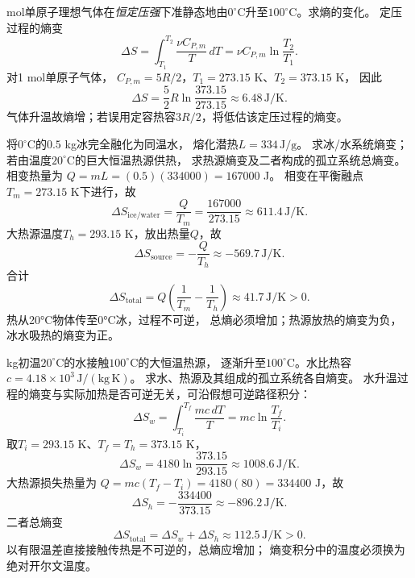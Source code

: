  mol单原子理想气体在\emph{恒定压强}下准静态地由$0^\circ$C升至$100^\circ$C。求熵的变化。
\workings
定压过程的熵变
\[
\Delta S=\int_{T_1}^{T_2}\frac{\nu C_{P,m}}T\,dT
=\nu C_{P,m}\ln\frac{T_2}{T_1}.
\]
对1 mol单原子气体，
$C_{P,m}=5R/2$，$T_1=273.15$ K、$T_2=373.15$ K，
因此
\[
\boxed{\Delta S=\frac52R\ln\frac{373.15}{273.15}
\approx6.48\,\mathrm{J/K}}.
\]
\crosscheck 气体升温故熵增；若误用定容热容$3R/2$，将低估该定压过程的熵变。

\problemtext 将$0^\circ$C的$0.5$ kg冰完全融化为同温水，
熔化潜热$L=334\,\mathrm{J/g}$。
求冰/水系统熵变；若由温度$20^\circ$C的巨大恒温热源供热，
求热源熵变及二者构成的孤立系统总熵变。
\workings
相变热量为
$Q=mL=(0.5)(334000)=167000$ J。
相变在平衡融点$T_m=273.15$ K下进行，故
\[
\boxed{\Delta S_{\mathrm{ice/water}}
=\frac{Q}{T_m}=\frac{167000}{273.15}
\approx611.4\,\mathrm{J/K}}.
\]
大热源温度$T_h=293.15$ K，放出热量$Q$，故
\[
\boxed{\Delta S_{\mathrm{source}}=-\frac{Q}{T_h}
\approx-569.7\,\mathrm{J/K}}.
\]
合计
\[
\boxed{\Delta S_{\mathrm{total}}
=Q\left(\frac1{T_m}-\frac1{T_h}\right)
\approx41.7\,\mathrm{J/K}>0}.
\]
\crosscheck 热从20°C物体传至0°C冰，过程不可逆，
总熵必须增加；热源放热的熵变为负，冰水吸热的熵变为正。

 kg初温$20^\circ$C的水接触$100^\circ$C的大恒温热源，
逐渐升至$100^\circ$C。水比热容
$c=4.18\times10^3\,\mathrm{J/(kg\,K)}$。
求水、热源及其组成的孤立系统各自熵变。
\workings
水升温过程的熵变与实际加热是否可逆无关，可沿假想可逆路径积分：
\[
\Delta S_w=\int_{T_i}^{T_f}\frac{mc\,dT}{T}
=mc\ln\frac{T_f}{T_i}.
\]
取$T_i=293.15$ K、$T_f=T_h=373.15$ K，
\[
\boxed{\Delta S_w
=4180\ln\frac{373.15}{293.15}
\approx1008.6\,\mathrm{J/K}}.
\]
大热源损失热量为
$Q=mc(T_f-T_i)=4180(80)=334400$ J，故
\[
\boxed{\Delta S_h=-\frac{334400}{373.15}
\approx-896.2\,\mathrm{J/K}}.
\]
二者总熵变
\[
\boxed{\Delta S_{\mathrm{total}}
=\Delta S_w+\Delta S_h
\approx112.5\,\mathrm{J/K}>0}.
\]
\crosscheck 以有限温差直接接触传热是不可逆的，总熵应增加；
熵变积分中的温度必须换为绝对开尔文温度。
